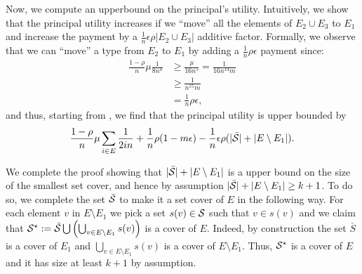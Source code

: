     Now, we compute an upperbound on the principal's utility. Intuitively, we show that the principal utility increases if we ``move'' all the elements of $E_2\cup E_3$ to $E_1$ and increase the payment by a $\frac{1}{n}\epsilon\rho |E_2\cup E_3|$ additive factor.
    Formally, we observe that we can ``move'' a type from $E_2$ to $E_1$ by adding a $\frac{1}{n}\rho\epsilon$ payment since:
	\begin{align*}
		\frac{1-\rho}{n} \mu \frac{1}{8n^4}&\ge \frac{\mu}{16n^5}=\frac{1}{16n^{14}m}\\
		&\ge\frac{1}{n^{15}m}\tag{for $n$ large enough}\\
		&=\frac{1}{n}\rho\epsilon,
    \end{align*}
	and thus, starting from , we find that the principal utility is upper bounded by
	\[
	\frac{1-\rho}{n}\mu\sum_{i\in E}\frac{1}{2in}+\frac{1}{n}\rho(1-m\epsilon)-\frac{1}{n}\epsilon\rho(|\bar{\mathcal{S}}|+|E\setminus E_1|).
	\]

    We complete the proof showing that $|\bar{\mathcal{S}}|+|E\setminus E_1|$ is a upper bound on the size of the smallest set cover, and hence by assumption  $|\bar{\mathcal{S}}|+|E\setminus E_1|\ge k+1$.
    To do so, we complete the set $\bar {\mathcal{S}}$ to make it a set cover of $E$ in the following way. For each element $v$ in $E\setminus E_1$ we pick a set $s(v)\in\mathcal{S}$ such that $v\in s(v)$ and we claim that $\mathcal{S}^\star:=\bar{\mathcal{S}}\bigcup\left( \bigcup_{v\in E\setminus E_1}s(v)\right)$ is a cover of $E$.
    Indeed, by construction the set $\bar S$ is a cover of $E_1$ and $\bigcup_{v\in E\setminus E_1}s(v)$ is a cover of $E\setminus E_1$. Thus, $\mathcal{S}^\star$ is a cover of $E$ and it has size at least $k+1$ by assumption. 
    
